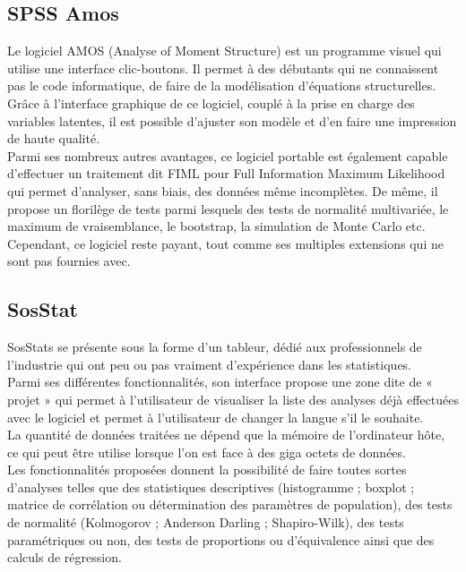\documentclass[a4paper,10pt]{report}
\begin{document}
\subsection{SPSS Amos}
Le logiciel AMOS (Analyse of Moment Structure) est un programme visuel qui utilise une interface clic-boutons. Il permet à des débutants qui ne connaissent pas le code informatique, de faire de la modélisation d’équations structurelles. \\

Grâce à l’interface graphique de ce logiciel, couplé à la prise en charge des variables latentes, il est possible d’ajuster son modèle et d’en faire une impression de haute qualité. \\

Parmi ses nombreux autres avantages, ce logiciel portable est également capable d’effectuer un traitement dit FIML pour Full Information Maximum Likelihood qui permet d’analyser, sans biais, des données même incomplètes. De même, il propose un florilège de tests parmi lesquels des tests de normalité multivariée, le maximum de vraisemblance, le bootstrap, la simulation de Monte Carlo etc. \\

Cependant, ce logiciel reste payant, tout comme ses multiples extensions qui ne sont pas fournies avec.  \\

\subsection{SosStat}
SosStats se présente sous la forme d’un tableur, dédié aux professionnels de l’industrie qui ont peu ou pas vraiment d’expérience dans les statistiques. \\

Parmi ses différentes fonctionnalités, son interface propose une zone dite de « projet » qui permet à l’utilisateur de visualiser la liste des analyses déjà effectuées avec le logiciel et permet à l’utilisateur de changer la langue s’il le souhaite.\\
La quantité de données traitées ne dépend que la mémoire de l’ordinateur hôte, ce qui peut être utilise lorsque l’on est face à des giga octets de données. \\
Les fonctionnalités proposées donnent la possibilité de faire toutes sortes d’analyses telles que des statistiques descriptives (histogramme ; boxplot ; matrice de corrélation ou détermination des paramètres de population), des tests de normalité (Kolmogorov ; Anderson Darling ; Shapiro-Wilk), des tests paramétriques ou non, des tests de proportions ou d’équivalence ainsi que des calculs de régression.\\
\end{document}
